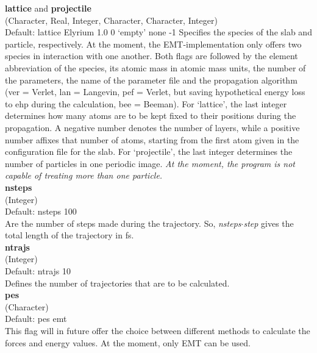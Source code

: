 \documentclass[twoside, 11pt, titlepage, captions=nooneline, a4paper, headsepline]{scrbook}%
\newcommand{\9}{\mathrm}
\newcommand{\0}{\,\mathrm}
\begin{document}
\noindent\textbf{lattice} and \textbf{projectile}\\ 
(Character, Real, Integer, Character, Character, Integer)\\ 
Default: lattice Elyrium 1.0 0 `empty' none -1
Specifies the species of the slab and particle, respectively. At the moment, the EMT-implementation only offers two species in interaction with one another. Both flags are followed by the element abbreviation of the species, its atomic mass in atomic mass units, the number of the parameters, the name of the parameter file and the propagation algorithm (ver = Verlet, lan = Langevin, pef = Verlet, but saving hypothetical energy loss to ehp during the calculation, bee = Beeman). For `lattice', the last integer determines how many atoms are to be kept fixed to their positions during the propagation. A negative number denotes the number of layers, while a positive number affixes that number of atoms, starting from the first atom given in the configuration file for the slab. For `projectile', the last integer determines the number of particles in one periodic image. \textit{At the moment, the program is not capable of treating more than one particle.}\\

\noindent\textbf{nsteps}\\(Integer)\\
Default: nsteps 100\\
Are the number of steps made during the trajectory. So, \textit{nsteps}$\cdot$\textit{step} gives the total length of the trajectory in fs.\\

\noindent\textbf{ntrajs}\\
(Integer)\\
Default: ntrajs 10\\
Defines the number of trajectories that are to be calculated.\\

\noindent\textbf{pes}\\
(Character)\\
Default: pes emt\\
This flag will in future offer the choice between different methods to calculate the forces and energy values. At the moment, only EMT can be used.\\
\end{document}
